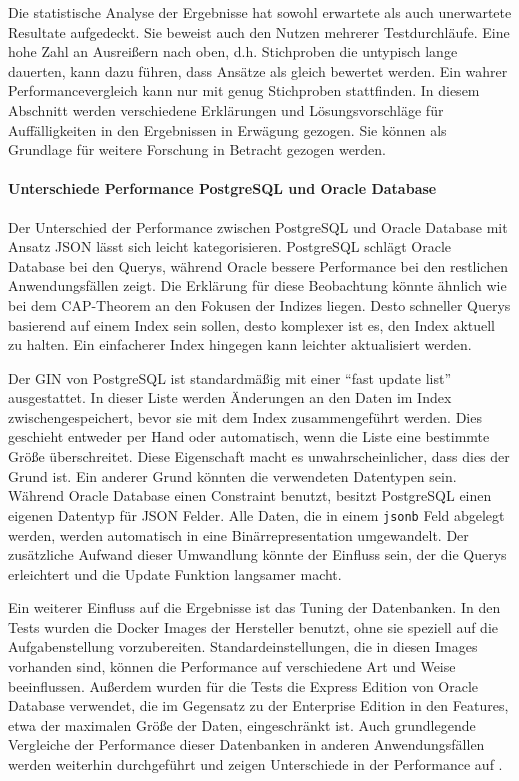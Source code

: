 Die statistische Analyse der Ergebnisse hat sowohl erwartete als auch unerwartete Resultate aufgedeckt. Sie beweist auch den Nutzen mehrerer Testdurchläufe. Eine hohe Zahl an Ausreißern nach oben, d.h. Stichproben die untypisch lange dauerten, kann dazu führen, dass Ansätze als gleich bewertet werden. Ein wahrer Performancevergleich kann nur mit genug Stichproben stattfinden. In diesem Abschnitt werden verschiedene Erklärungen und Lösungsvorschläge für Auffälligkeiten in den Ergebnissen in Erwägung gezogen. Sie können als Grundlage für weitere Forschung in Betracht gezogen werden.

\paragraph{Unterschiede Performance PostgreSQL und Oracle Database}

Der Unterschied der Performance zwischen PostgreSQL und Oracle Database mit Ansatz JSON lässt sich leicht kategorisieren. PostgreSQL schlägt Oracle Database bei den Querys, während Oracle bessere Performance bei den restlichen Anwendungsfällen zeigt. Die Erklärung für diese Beobachtung könnte ähnlich wie bei dem CAP-Theorem an den Fokusen der Indizes liegen. Desto schneller Querys basierend auf einem Index sein sollen, desto komplexer ist es, den Index aktuell zu halten. Ein einfacherer Index hingegen kann leichter aktualisiert werden.

Der \ac{GIN} von PostgreSQL ist standardmäßig mit einer ``fast update list'' ausgestattet. In dieser Liste werden Änderungen an den Daten im Index zwischengespeichert, bevor sie mit dem Index zusammengeführt werden. Dies geschieht entweder per Hand oder automatisch, wenn die Liste eine bestimmte Größe überschreitet. Diese Eigenschaft macht es unwahrscheinlicher, dass dies der Grund ist.
Ein anderer Grund könnten die verwendeten Datentypen sein. Während Oracle Database einen Constraint benutzt, besitzt PostgreSQL einen eigenen Datentyp für JSON Felder. Alle Daten, die in einem \lstinline|jsonb| Feld abgelegt werden, werden automatisch in eine Binärrepresentation umgewandelt. Der zusätzliche Aufwand dieser Umwandlung könnte der Einfluss sein, der die Querys erleichtert und die Update Funktion langsamer macht.

Ein weiterer Einfluss auf die Ergebnisse ist das Tuning der Datenbanken. In den Tests wurden die Docker Images der Hersteller benutzt, ohne sie speziell auf die Aufgabenstellung vorzubereiten. Standardeinstellungen, die in diesen Images vorhanden sind, können die Performance auf verschiedene Art und Weise beeinflussen. Außerdem wurden für die Tests die Express Edition von Oracle Database verwendet, die im Gegensatz zu der Enterprise Edition in den Features, etwa der maximalen Größe der Daten, eingeschränkt ist. Auch grundlegende Vergleiche der Performance dieser Datenbanken in anderen Anwendungsfällen werden weiterhin durchgeführt und zeigen Unterschiede in der Performance auf \cite{Martins.2021}.

